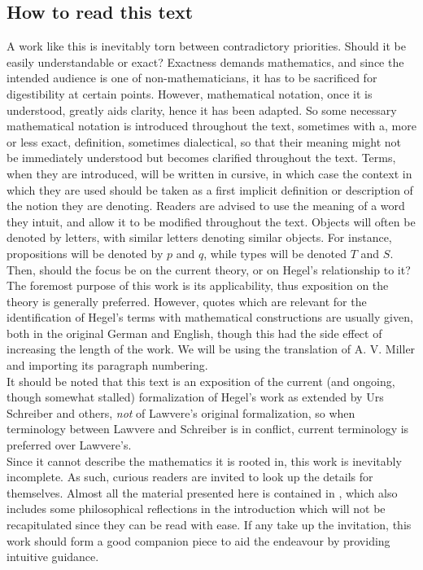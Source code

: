 \documentclass{article}
\begin{document}
\subsection{How to read this text}
A work like this is inevitably torn between contradictory priorities. Should it be easily understandable
or exact? Exactness demands mathematics, and since the intended audience is one of non-mathematicians,
it has to be sacrificed for digestibility at certain points. However, mathematical notation, once
it is understood, greatly aids clarity, hence it has been adapted. So some necessary mathematical
notation is introduced throughout the text, sometimes with a, more or less exact, definition, sometimes
dialectical, so that their meaning might not be immediately understood but becomes clarified throughout
the text. Terms, when they are introduced, will be written in cursive, in which case the context in
which they are used should be taken as a first implicit definition or description of the notion they are
denoting. Readers are advised to use the meaning of a word they intuit, and allow it to
be modified throughout the text. Objects will often be denoted by letters, with similar letters denoting 
similar objects. For instance, propositions will be denoted by $p$ and $q$, while types will be denoted $T$ 
and $S$.\\

Then, should the focus be on the current theory, or on Hegel's relationship to it? The foremost
purpose of this work is its applicability, thus exposition on the theory is generally preferred. However,
quotes which are relevant for the identification of Hegel's terms with mathematical constructions are
usually given, both in the original German and English, though this had the side effect of increasing
the length of the work. We will be using the translation of A. V. Miller and importing its paragraph numbering.
\\

It should be noted that this text is an exposition of the current (and ongoing, though somewhat stalled)
formalization of Hegel's work as extended by Urs Schreiber and others, \emph{not} of Lawvere's original
formalization, so when terminology between Lawvere and Schreiber is in conflict, current terminology is
preferred over Lawvere's. \\


Since it cannot describe the mathematics it is rooted in, this work is inevitably incomplete. As such,
 curious readers are invited to look up the details for themselves. Almost all the material presented
here is contained in \cite{nlabsol}, which also includes some philosophical reflections
in the introduction which will not be recapitulated since they can be read with ease. If any take up the
invitation, this work should form a good companion piece to aid the endeavour by providing intuitive guidance.
\end{document}
